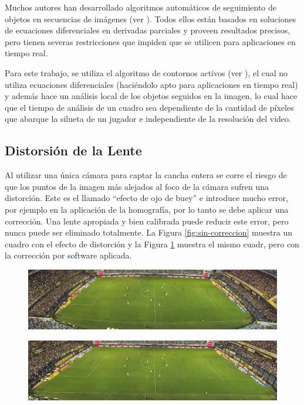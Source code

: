Muchos autores han desarrollado algoritmos automáticos de seguimiento de
objetos en secuencias de imágenes (ver \cite{IFTrace, alp, local-learning,
MHT-2}). Todos ellos están basados en soluciones de ecuaciones diferenciales en
derivadas parciales y proveen resultados precisos, pero tienen severas
restricciones que impiden que se utilicen para aplicaciones en tiempo real.

Para este trabajo, se utiliza el algoritmo de contornos activos (ver
\cite{fast-level-set}), el cual no utiliza ecuaciones diferenciales (haciéndolo
apto para aplicaciones en tiempo real) y además hace un análisis local de los
objetos seguidos en la imagen, lo cual hace que el tiempo de análisis de un
cuadro sea dependiente de la cantidad de píxeles que abarque la silueta de un
jugador e independiente de la resolución del video.

\subsection{Distorsión de la Lente}

Al utilizar una única cámara para captar la cancha entera se corre el riesgo de
que los puntos de la imagen más alejados al foco de la cámara sufren una
distorción. Este es el llamado ``efecto de ojo de buey'' e introduce mucho
error, por ejemplo en la aplicación de la homografía, por lo tanto se debe
aplicar una corrección. Una lente apropiada y bien calibrada puede reducir este
error, pero nunca puede ser eliminado totalmente. La Figura
\ref{fig:sin-correccion} muestra un cuadro con el efecto de distorción y la
Figura \ref{fig:con-correccion} muestra el mismo cuadr, pero con la corrección
por software aplicada.

\begin{figure}[H]
    \centering
    \includegraphics[width=.8\linewidth]{./images/sin-correccion.png}
    \label{fig:sin-correccion}
\begin{figure}[H]
\end{figure}
    \centering
    \includegraphics[width=.8\linewidth]{./images/con-correccion.png}
    \label{fig:con-correccion}
\end{figure}

